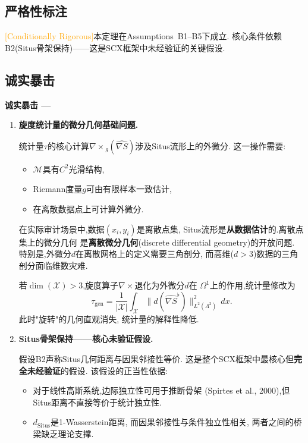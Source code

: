 \documentclass[12pt,a4paper]{article}
\newcommand{\conditionallyrigorous}{\textcolor{orange}{\small\textsf{[Conditionally Rigorous]}}}
\newenvironment{critique}{%
    \medskip\noindent
    {\bfseries\sffamily\color{red!60!black} 诚实暴击 --- }
    \itshape\small
}{\par\medskip}
\newcommand{\cX}{\mathcal{X}}
\newcommand{\cM}{\mathcal{M}}
\newcommand{\Situs}{\mathrm{Situs}}
\newcommand{\curl}{\nabla\! \times\!}
\begin{document}
\subsection{严格性标注}
\conditionallyrigorous\quad 本定理在Assumptions~B1--B5下成立.
核心条件依赖B2(Situs骨架保持)——这是SCX框架中未经验证的关键假设.

\subsection{诚实暴击}

\begin{critique}
    \begin{enumerate}
        \item[(C1)] \textbf{旋度统计量的微分几何基础问题.}

        统计量$\tau$的核心计算$\curl_g(\widehat{\nabla S})$涉及Situs流形上的外微分.
        这一操作需要:
        \begin{itemize}
            \item $\cM$具有$C^2$光滑结构,
            \item Riemann度量$g$可由有限样本一致估计,
            \item 在离散数据点上可计算外微分.
        \end{itemize}

        在实际审计场景中,数据$(x_i, y_i)$是离散点集,
        Situs流形是\textbf{从数据估计}的.离散点集上的微分几何
        是\textbf{离散微分几何}(discrete differential geometry)的开放问题.
        特别是,外微分$d$在离散网格上的定义需要三角剖分,
        而高维($d > 3$)数据的三角剖分面临维数灾难.

        若$\dim(\cX) > 3$,旋度算子$\curl$退化为外微分$d$在
        $\Omega^1$上的作用,统计量修改为
        \begin{equation}
            \tau_{\text{gen}} = \frac{1}{|\cX|}\int_{\cX}
            \|d(\widehat{\nabla S}^\flat)\|^2_{L^2(\Lambda^2)} \,dx.
        \end{equation}
        此时"旋转"的几何直观消失,
        统计量的解释性降低.

        \item[(C2)] \textbf{Situs骨架保持——核心未验证假设.}

        假设B2声称Situs几何距离与因果邻接性等价.
        这是整个SCX框架中最核心但\textbf{完全未经验证}的假设.
        该假设的正当性依据:
        \begin{itemize}
            \item 对于线性高斯系统,边际独立性可用于推断骨架
                  (Spirtes et al., 2000),但Situs距离不直接等价于统计独立性.
            \item $d_{\Situs}$是1-Wasserstein距离,
                  而因果邻接性与条件独立性相关,
                  两者之间的桥梁缺乏理论支撑.
        \end{itemize}


\end{enumerate}
\end{critique}
\end{document}
